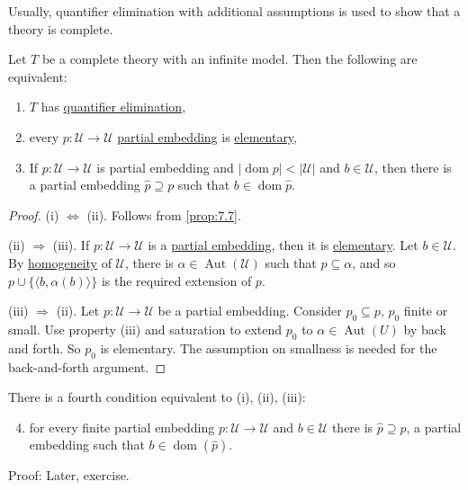 \documentclass{article}
\DeclareMathOperator{\Aut}{Aut}
\DeclareMathOperator{\dom}{dom}
\DeclareMathOperator{\img}{img}
\begin{document}
\begin{remark}
Usually, quantifier elimination with additional assumptions is used to show that a theory is complete.
\end{remark}
\begin{nthm}
  Let $T$ be a complete theory with an infinite model. Then the following are equivalent:
  \begin{enumerate}[label=(\roman*)]
    \item $T$ has \hyperlink{def:qe}{quantifier elimination},
    \item every $p: \mathcal{U} \to \mathcal{U}$ \hyperlink{def:upe}{partial embedding} is \hyperlink{def:el}{elementary},
    \item If $p: \mathcal{U} \to \mathcal{U}$ is partial embedding and $|\dom p| < |\mathcal{U}|$ and $b \in \mathcal{U}$, then there is a partial embedding $\hat{p} \supseteq p$ such that $b \in \dom \hat{p}$.
  \end{enumerate}
\end{nthm}
\begin{proof}
  (i) $\Leftrightarrow$ (ii). Follows from \cref{prop:7.7}.

  (ii) $\Rightarrow$ (iii). If $p: \mathcal{U} \to \mathcal{U}$ is a \hyperlink{def:upe}{partial embedding}, then it is \hyperlink{def:elmap}{elementary}.
  Let $b \in \mathcal{U}$.
  By \hyperlink{def:homogeneous}{homogeneity} of $\mathcal{U}$, there is $\alpha \in \Aut(\mathcal{U})$ such that $p \subseteq \alpha$, and so $p \cup \{\langle b, \alpha(b) \rangle \}$ is the required extension of $p$.

  (iii) $\Rightarrow$ (ii). Let $p: \mathcal{U} \to \mathcal{U}$ be a partial embedding.
  Consider $p_0 \subseteq p$, $p_0$ finite or small. Use property (iii) and saturation to extend $p_0$ to $\alpha \in \Aut(U)$ by back and forth.
  So $p_0$ is elementary. The assumption on smallness is needed for the back-and-forth argument.
\end{proof}
\begin{remark}
  There is a fourth condition equivalent to (i), (ii), (iii):
  \begin{enumerate}[label=(\roman*)]\setcounter{enumi}{3}
    \item for every finite partial embedding $p: \mathcal{U} \to \mathcal{U}$ and $b \in \mathcal{U}$ there is $\hat{p} \supseteq p$, a partial embedding such that $b \in \dom(\hat{p})$.
  \end{enumerate}

  Proof: Later, exercise.
\end{remark}
\end{document}
